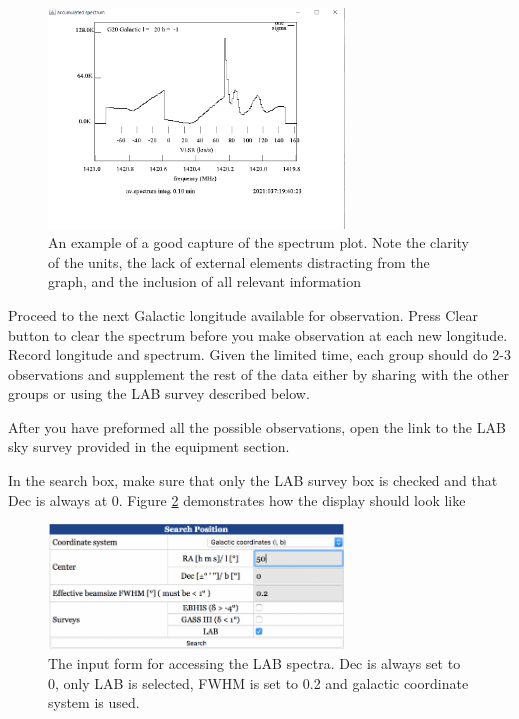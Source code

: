 \begin{figure}
	\centering
	\includegraphics[width = 0.7\textwidth]{srt-galaxy-rotation/spectrum_ex}
	\caption{An example of a good capture of the spectrum plot. Note the clarity of the units, the lack of external elements distracting from the graph, and the inclusion of all relevant information} 
	\label{sgr:fig:spec-example}
\end{figure}

\begin{steps}
	\item Proceed to the next Galactic longitude available for observation. Press Clear button to clear the spectrum before you make observation at
	each new longitude. Record longitude and spectrum. Given the limited time, each group should do 2-3 observations and supplement the rest of the data either by sharing with the other groups or using the LAB survey described below.%
	
	\item After you have preformed all the possible observations, open the link to the LAB sky survey provided in the equipment section. 
	
	\item In the search box, make sure that only the LAB survey box is checked and that Dec is always at 0. Figure \ref{sgr:fig:lab-box} demonstrates how the display should look like
\end{steps}

\begin{figure}
	\centering
	\includegraphics[width = 0.7\textwidth]{srt-galaxy-rotation/LAB_box}
	\caption{The input form for accessing the LAB spectra. Dec is always set to 0, only LAB is selected, FWHM is set to 0.2 and galactic coordinate system is used.} 
	\label{sgr:fig:lab-box}
\end{figure}

